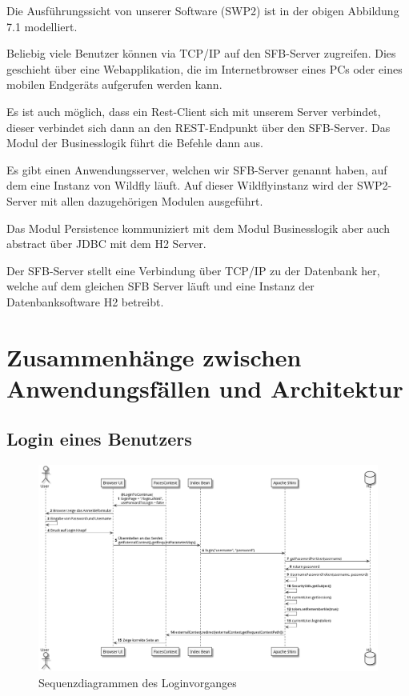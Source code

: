 \documentclass[enabledeprecatedfontcommands,fontsize=12pt,paper=a4,twoside]{scrartcl}
\begin{document}
{{ Die Ausführungssicht von unserer Software (SWP2) ist in der obigen Abbildung
  7.1 modelliert.

Beliebig viele Benutzer können via TCP/IP auf den SFB-Server zugreifen. Dies
geschieht über eine Webapplikation, die im Internetbrowser eines PCs oder eines
mobilen Endgeräts aufgerufen werden kann.

Es ist auch möglich, dass ein Rest-Client sich mit unserem Server verbindet,
dieser verbindet sich dann an den REST-Endpunkt über den SFB-Server. Das Modul
der Businesslogik führt die Befehle dann aus.

Es gibt einen Anwendungsserver, welchen wir SFB-Server genannt haben, auf dem
eine Instanz von Wildfly läuft. Auf dieser Wildflyinstanz wird der SWP2-Server
mit allen dazugehörigen Modulen ausgeführt.

Das Modul Persistence kommuniziert mit dem Modul Businesslogik aber auch
\glqq abstract\grqq{} über JDBC mit dem H2 Server.

Der SFB-Server stellt eine Verbindung über TCP/IP zu der
Datenbank her, welche auf dem gleichen SFB Server läuft und eine Instanz der Datenbanksoftware H2 betreibt.
}

\section[Zusammenhänge zwischen Anwendungsfällen und Architektur]{Zusammenhänge zwischen Anwendungsfällen und Architektur}
\label{sec:anwendungsfaelle}


\subsection{Login eines Benutzers}
\begin{figure}[H]
  \includegraphics[width=\linewidth]{UML/aw/erstbenutzung.png}
  \caption{Sequenzdiagrammen des Loginvorganges}
  \label{fig:erstbenutzung.png}
\end{figure}

}
\end{document}
